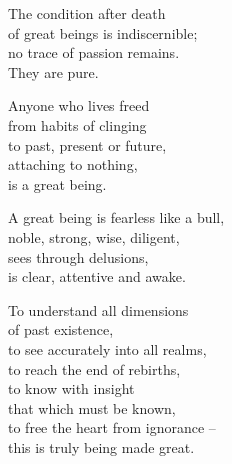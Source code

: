 The condition after death\\
of great beings is indiscernible;\\
no trace of passion remains.\\
They are pure.


Anyone who lives freed\\
from habits of clinging\\
to past, present or future,\\
attaching to nothing,\\
is a great being.


A great being is fearless like a bull,\\
noble, strong, wise, diligent,\\
sees through delusions,\\
is clear, attentive and awake.


To understand all dimensions\\
of past existence,\\
to see accurately into all realms,\\
to reach the end of rebirths,\\
to know with insight\\
that which must be known,\\
to free the heart from ignorance --\\
this is truly being made great.

